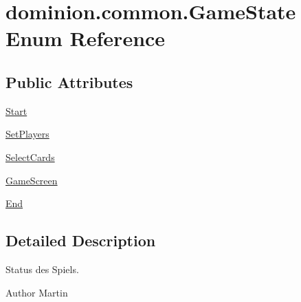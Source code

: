 \hypertarget{enumdominion_1_1common_1_1GameState}{\section{dominion.\-common.\-Game\-State \-Enum \-Reference}
\label{enumdominion_1_1common_1_1GameState}
}
\subsection*{\-Public \-Attributes}
\begin{DoxyCompactItemize}
\item 
\hyperlink{enumdominion_1_1common_1_1GameState_a032950f49707dd83459b2f70bec317d6}{\-Start}
\item 
\hyperlink{enumdominion_1_1common_1_1GameState_ab9159427f4d60ee6b16ac1c22a97a231}{\-Set\-Players}
\item 
\hyperlink{enumdominion_1_1common_1_1GameState_a11ac860290b096520b182bc6de3975c8}{\-Select\-Cards}
\item 
\hyperlink{enumdominion_1_1common_1_1GameState_a98a26aa38514d24f92b079906e28cc39}{\-Game\-Screen}
\item 
\hyperlink{enumdominion_1_1common_1_1GameState_a0a59c36ad43887d29b383ad266033b1e}{\-End}
\end{DoxyCompactItemize}


\subsection{\-Detailed \-Description}
\-Status des \-Spiels.

\begin{DoxyAuthor}{\-Author}
\-Martin 
\end{DoxyAuthor}


